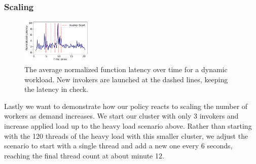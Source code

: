 \subsubsection{Scaling}

\begin{figure}  
  \includegraphics[width=0.3\textwidth]{chrlu/faaslb-osdi22/figs/scaling/scaling_lat_over_time-nolabel.pdf}
  \centering
  \caption{The average normalized function latency over time for a dynamic workload. New invokers are launched at the dashed lines, keeping the latency in check.}
  \label{fig:scaling-latency}
\end{figure}



Lastly we want to demonstrate how our policy reacts to scaling the number of workers as demand increases.
We start our cluster with only 3 invokers and increase applied load up to the heavy load scenario above.
Rather than starting with the 120 threads of the heavy load with this smaller cluster, we adjust the scenario to start with a single thread and add a new one every 6 seconds, reaching the final thread count at about minute 12.

